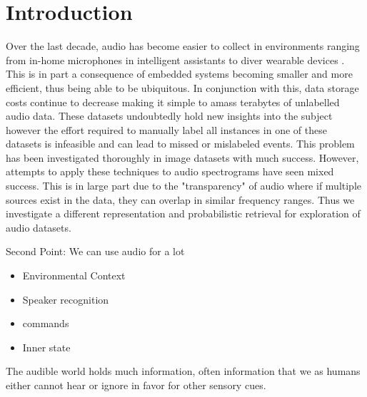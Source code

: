 \section{Introduction}

Over the last decade, audio has become easier to collect in environments ranging from in-home microphones in intelligent assistants to diver wearable devices \cite{kohlsdorf_underwater_2013}. This is in part a consequence of embedded systems becoming smaller and more efficient, thus being able to be ubiquitous. In conjunction with this, data storage costs continue to decrease making it simple to amass terabytes of unlabelled audio data. These datasets undoubtedly hold new insights into the subject however the effort required to manually label all instances in one of these datasets is infeasible and can lead to missed or mislabeled events. This problem has been investigated thoroughly in image datasets with much success. However, attempts to apply these techniques to audio spectrograms have seen mixed success. This is in large part due to the "transparency" of audio where if multiple sources exist in the data, they can overlap in similar frequency ranges. Thus we investigate a different representation and probabilistic retrieval for exploration of audio datasets.

Second Point: We can use audio for a lot
\begin{itemize}
    \item Environmental Context
    \item Speaker recognition
    \item commands
    \item Inner state
\end{itemize}

The audible world holds much information, often information that we as humans either cannot hear or ignore in favor for other sensory cues. 

